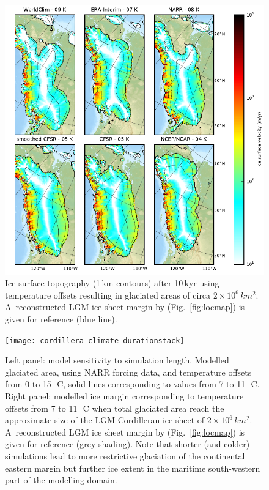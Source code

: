 \documentclass[tc, ms]{copernicus}
\begin{document}
\begin{figure}[t]
	\vspace*{2mm}
	\begin{center}
		\includegraphics{cordillera-climate-best}
	\end{center}
	\caption{Ice surface topography (1\,km contours) after 10\,kyr using temperature offsets resulting in glaciated areas of circa $2 \times 10^6\,\unit{km^2}$. A~reconstructed LGM ice sheet margin by \citet{dyke-2004} (Fig.~\ref{fig:locmap}) is given for reference (blue line).}
	\label{fig:best}
\end{figure}

\begin{figure}[t]
	\vspace*{2mm}
	\begin{center}
		\texttt{[image: cordillera-climate-durationstack]}
	\end{center}
	\caption{Left panel: model sensitivity to simulation length. Modelled glaciated area, using NARR forcing data, and temperature offsets from 0 to 15\,\unit{{\degree}C}, solid lines corresponding to values from 7 to 11\,\unit{{\degree}C}. Right panel: modelled ice margin corresponding to temperature offsets from 7 to 11\,\unit{{\degree}C} when total glaciated area reach the approximate size of the LGM Cordilleran ice sheet of $2 \times 10^6\,\unit{km^2}$. A~reconstructed LGM ice sheet margin by \citet{dyke-2004} (Fig.~\ref{fig:locmap}) is given for reference (grey shading). Note that shorter (and colder) simulations lead to more restrictive glaciation of the continental eastern margin but further ice extent in the maritime south-western part of the modelling domain.}
	\label{fig:durationstack}
\end{figure}

\end{document}
